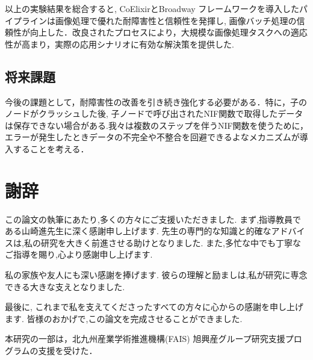 \documentclass[a4paper]{jreport}	%
\begin{document}
以上の実験結果を総合すると, CoElixirとBroadway フレームワークを導入したパイプラインは画像処理で優れた耐障害性と信頼性を発揮し, 画像バッチ処理の信頼性が向上した．改良されたプロセスにより，大規模な画像処理タスクへの適応性が高まり，実際の応用シナリオに有効な解決策を提供した.



\section{将来課題}
今後の課題として，耐障害性の改善を引き続き強化する必要がある．特に，子のノードがクラッシュした後, 子ノードで呼び出されたNIF関数で取得したデータは保存できない場合がある.我々は複数のステップを伴うNIF関数を使うために，エラーが発生したときデータの不完全や不整合を回避できるよなメカニズムが導入することを考える．
\chapter*{謝辞}
この論文の執筆にあたり,多くの方々にご支援いただきました. まず,指導教員である山崎進先生に深く感謝申し上げます. 先生の専門的な知識と的確なアドバイスは,私の研究を大きく前進させる助けとなりました. また,多忙な中でも丁寧なご指導を賜り,心より感謝申し上げます. 

私の家族や友人にも深い感謝を捧げます. 彼らの理解と励ましは,私が研究に専念できる大きな支えとなりました. 

最後に, これまで私を支えてくださったすべての方々に心からの感謝を申し上げます. 皆様のおかげで,この論文を完成させることができました. 

本研究の一部は，北九州産業学術推進機構(FAIS) 旭興産グループ研究支援プログラムの支援を受けた．



\newpage
{}
\renewcommand{\bibname}{参考文献}

%
%
\end{document}
